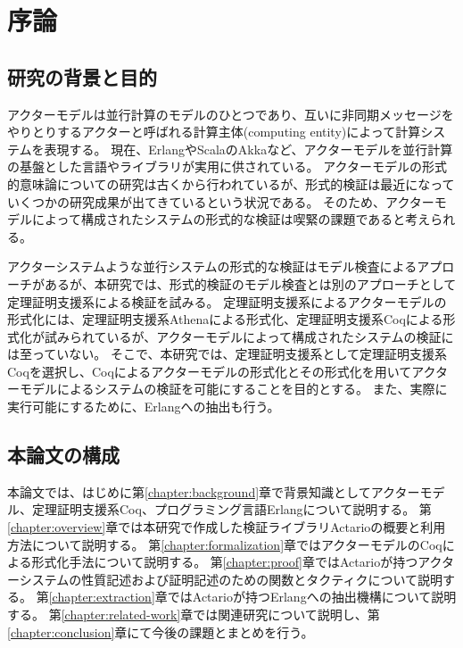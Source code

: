 \chapter{序論}
\label{chapter:intro}

\section{研究の背景と目的}
アクターモデル\cite{}は並行計算のモデルのひとつであり、互いに非同期メッセージをやりとりするアクターと呼ばれる計算主体(computing entity)によって計算システムを表現する。
現在、Erlang\cite{}やScala\cite{}のAkka\cite{}など、アクターモデルを並行計算の基盤とした言語やライブラリが実用に供されている。
アクターモデルの形式的意味論についての研究は古くから行われているが、形式的検証は最近になっていくつかの研究成果が出てきているという状況である。
そのため、アクターモデルによって構成されたシステムの形式的な検証は喫緊の課題であると考えられる。

アクターシステムような並行システムの形式的な検証はモデル検査によるアプローチがあるが、本研究では、形式的検証のモデル検査とは別のアプローチとして定理証明支援系による検証を試みる。
定理証明支援系によるアクターモデルの形式化には、定理証明支援系Athenaによる形式化\cite{}、定理証明支援系Coqによる形式化\cite{}が試みられているが、アクターモデルによって構成されたシステムの検証には至っていない。
そこで、本研究では、定理証明支援系として定理証明支援系Coqを選択し、Coqによるアクターモデルの形式化とその形式化を用いてアクターモデルによるシステムの検証を可能にすることを目的とする。
また、実際に実行可能にするために、Erlangへの抽出も行う。


\section{本論文の構成}
本論文では、はじめに第\ref{chapter:background}章で背景知識としてアクターモデル、定理証明支援系Coq、プログラミング言語Erlangについて説明する。
第\ref{chapter:overview}章では本研究で作成した検証ライブラリActarioの概要と利用方法について説明する。
第\ref{chapter:formalization}章ではアクターモデルのCoqによる形式化手法について説明する。
第\ref{chapter:proof}章ではActarioが持つアクターシステムの性質記述および証明記述のための関数とタクティクについて説明する。
第\ref{chapter:extraction}章ではActarioが持つErlangへの抽出機構について説明する。
第\ref{chapter:related-work}章では関連研究について説明し、第\ref{chapter:conclusion}章にて今後の課題とまとめを行う。
